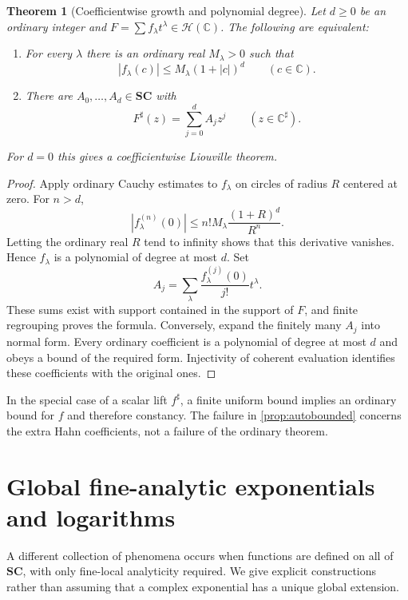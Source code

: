 \documentclass[11pt,letterpaper]{article}
\newtheorem{theorem}{Theorem}[section]
\theoremstyle{definition}
\theoremstyle{remark}
\newcommand{\SC}{\mathbf{SC}}
\newcommand{\C}{\mathbb C}
\newcommand{\HH}{\mathcal H}
\newcommand{\sh}{^{\sharp}}
\numberwithin{equation}{section}
\begin{document}
\begin{theorem}[Coefficientwise growth and polynomial degree]\label{thm:coeffLiouville}
Let $d\ge0$ be an ordinary integer and $F=\sum f_\lambda t^\lambda\in\HH(\C)$. The following are equivalent:
\begin{enumerate}
\item For every $\lambda$ there is an ordinary real $M_\lambda>0$ such that
\[
 |f_\lambda(c)|\le M_\lambda(1+|c|)^d\qquad(c\in\C).
\]
\item There are $A_0,\ldots,A_d\in\SC$ with
\[
 F\sh(z)=\sum_{j=0}^d A_jz^j\qquad(z\in\C\sh).
\]
\end{enumerate}
For $d=0$ this gives a coefficientwise Liouville theorem.
\end{theorem}
\begin{proof}
Apply ordinary Cauchy estimates to $f_\lambda$ on circles of radius $R$ centered at zero. For $n>d$,
\[
 |f_\lambda^{(n)}(0)|\le n!M_\lambda\frac{(1+R)^d}{R^n}.
\]
Letting the ordinary real $R$ tend to infinity shows that this derivative vanishes. Hence $f_\lambda$ is a polynomial of degree at most $d$. Set
\[
 A_j=\sum_\lambda \frac{f_\lambda^{(j)}(0)}{j!}t^\lambda.
\]
These sums exist with support contained in the support of $F$, and finite regrouping proves the formula. Conversely, expand the finitely many $A_j$ into normal form. Every ordinary coefficient is a polynomial of degree at most $d$ and obeys a bound of the required form. Injectivity of coherent evaluation identifies these coefficients with the original ones.
\end{proof}
In the special case of a scalar lift $f\sh$, a finite uniform bound implies an ordinary bound for $f$ and therefore constancy. The failure in \cref{prop:autobounded} concerns the extra Hahn coefficients, not a failure of the ordinary theorem.

\section{Global fine-analytic exponentials and logarithms}\label{sec:globalexp}
A different collection of phenomena occurs when functions are defined on all of $\SC$, with only fine-local analyticity required. We give explicit constructions rather than assuming that a complex exponential has a unique global extension.
\end{document}
